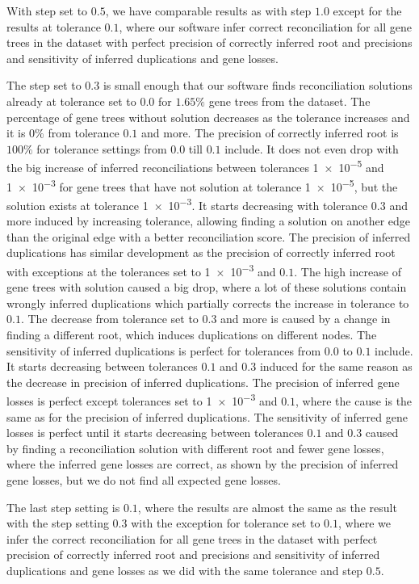 With step set to $0.5$, we have comparable results as with step $1.0$ except for the results at tolerance $0.1$, where our software infer correct reconciliation for all gene trees in the dataset with perfect precision of correctly inferred root and precisions and sensitivity of inferred duplications and gene losses.

The step set to $0.3$  is small enough that our software finds reconciliation solutions already at tolerance set to $0.0$ for $1.65\%$ gene trees from the dataset. The percentage of gene trees without solution decreases as the tolerance increases and it is $0\%$ from tolerance $0.1$ and more. The precision of correctly inferred root is $100\%$ for tolerance settings from $0.0$ till $0.1$ include. It does not even drop with the big increase of inferred reconciliations between tolerances \num{1e-5} and \num{1e-3} for gene trees that have not solution at tolerance \num{1e-5}, but the solution exists at tolerance \num{1e-3}. It starts decreasing with tolerance $0.3$ and more induced by increasing tolerance, allowing finding a solution on another edge than the original edge with a better reconciliation score. The precision of inferred duplications has similar development as the precision of correctly inferred root with exceptions at the tolerances set to \num{1e-3} and $0.1$. The high increase of gene trees with solution caused a big drop, where a lot of these solutions contain wrongly inferred duplications which partially corrects the increase in tolerance to $0.1$. The decrease from tolerance set to $0.3$ and more is caused by a change in finding a different root, which induces duplications on different nodes. The sensitivity of inferred duplications is perfect for tolerances from $0.0$ to $0.1$ include. It starts decreasing between tolerances $0.1$ and $0.3$ induced for the same reason as the decrease in precision of inferred duplications. The precision of inferred gene losses is perfect except tolerances set to \num{1e-3} and $0.1$, where the cause is the same as for the precision of inferred duplications. The sensitivity of inferred gene losses is perfect until it starts decreasing between tolerances $0.1$ and $0.3$ caused by finding a reconciliation solution with different root and fewer gene losses, where the inferred gene losses are correct, as shown by the precision of inferred gene losses, but we do not find all expected gene losses.

The last step setting is $0.1$, where the results are almost the same as the result with the step setting $0.3$ with the exception for tolerance set to $0.1$, where we infer the correct reconciliation for all gene trees in the dataset with perfect precision of correctly inferred root and precisions and sensitivity of inferred duplications and gene losses as we did with the same tolerance and step $0.5$.

